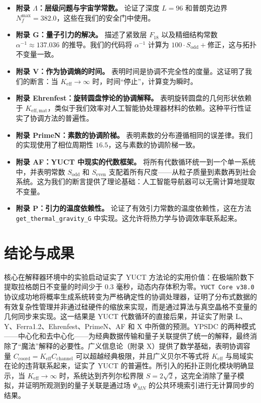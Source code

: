 \documentclass[11pt,a4paper]{article}
\begin{document}
\begin{itemize}
		\item \textbf{附录 \(\Lambda\)：层级问题与宇宙学常数。}  
		论证了深度 \(L = 96\) 和普朗克边界 \(N_f^{\max} = 382.0\)，这些在我们的安全门中使用。
		
		\item \textbf{附录 G：量子引力的解决。}  
		描述了紧致层 \(F_{18}\) 以及精细结构常数 \(\alpha^{-1} \approx 137.036\) 的推导。我们的代码将 \(\alpha^{-1}\) 计算为 \(100 \cdot S_{\mathrm{odd}} + \text{修正}\)，这与拓扑不变量一致。
		
		\item \textbf{附录 V：作为协调熵的时间。}  
		表明时间是协调不完全性的度量。这证明了我们的断言：当 \(K_{\mathrm{eff}} \to \infty\) 时，时间“停止”，计算变为瞬时。
		
		\item \textbf{附录 Ehrenfest：旋转圆盘悖论的协调解释。}  
		表明旋转圆盘的几何形状依赖于 \(K_{\mathrm{eff,mat}}\)，类似于我们效率对人工智能协处理器材料的依赖。这种平行性证实了协调方法的普遍性。
		
		\item \textbf{附录 PrimeN：素数的协调阶梯。}  
		表明素数的分布遵循相同的误差律。我们的实现使用了相位周期性 \(16.5\)，这与素数的协调阶梯一致。
		
		\item \textbf{附录 AF：YUCT 中现实的代数框架。}  
		将所有代数循环统一到一个单一系统中，并表明常数 \(S_{\mathrm{odd}}\) 和 \(S_{\mathrm{even}}\) 支配着所有尺度——从粒子质量到素数再到社会系统。这为我们的断言提供了理论基础：人工智能导航器可以无需计算地提取不变量。
		
		\item \textbf{附录 P：引力的温度依赖性。}  
		论证了有效引力常数的温度依赖性，这在方法 \texttt{get\_thermal\_gravity\_G} 中实现。这允许将热力学与协调效率联系起来。
	\end{itemize}
	
	\section{结论与成果}
	核心在解释器环境中的实验启动证实了 YUCT 方法论的实用价值：在极端阶数下提取拉格朗日不变量的时间少于 0.3 毫秒，动态内存体积为零。\texttt{YUCT Core v38.0} 协议成功地将概率生成系统转变为严格确定性的协调处理器，证明了分布式数据的有效复杂性管理并非通过硅硬件的缩放来实现，而是通过算法与真空晶格不变量的几何同步来实现。这一结果是 YUCT 代数循环的直接后果，并证实了附录 L、Y、Ferra1.2、Ehrenfest、PrimeN、AF 和 X 中所做的预测。YPSDC 的两种模式——中心化和去中心化——为经典数据传输和量子关联提供了统一的解释，最终消除了“魔法”解释的必要性。广义信息论（附录 X）提供了数学基础，表明协调容量 \(C_{\text{coord}} = K_{\mathrm{eff}} C_{\text{channel}}\) 可以超越经典极限，并且广义贝尔不等式将 \(K_{\mathrm{eff}}\) 与局域实在论的违背联系起来，证实了 YUCT 的普遍性。所引入的拓扑正则化模块明确显示，当 \(K_{\mathrm{eff}} \to \infty\) 时，系统达到齐列尔松界限 \(S = 2\sqrt{2}\)，这完全消除了量子模拟，并证明所观测到的量子关联是通过场 \(\Psi_{MN}\) 的公共环境索引进行无计算同步的结果。
	
\end{document}
